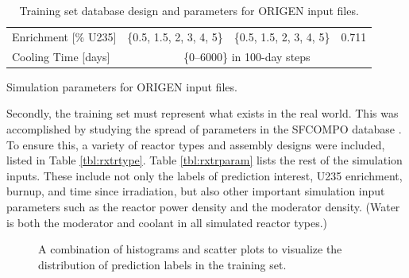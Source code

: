 \begin{table}[!htb]
\begin{subtable}{\linewidth}
\begin{tabular}{@{}llll@{}}
      Enrichment [\% U235]    & \{0.5, 1.5, 2, 3, 4, 5\}         & \{0.5, 1.5, 2, 3, 4, 5\}         & 0.711         \\
      Cooling Time [days]     & \multicolumn{3}{c}{\{0--6000\} in 100-day steps}                                    \\ \bottomrule
    \end{tabular}
    \caption{Simulation parameters for \gls{ORIGEN} input files.}
    \label{tbl:rxtrparam}
  \end{subtable}%
  \caption{Training set database design and parameters for \gls{ORIGEN} input files.}
  \label{tbl:train}
\end{table}

Secondly, the training set must represent what exists in the real world. This
was accomplished by studying the spread of parameters in the \gls{SFCOMPO}
database \cite{sfcompo, valid_sfco}.  To ensure this, a variety of reactor
types and assembly designs were included, listed in Table \ref{tbl:rxtrtype}.
Table \ref{tbl:rxtrparam} lists the rest of the simulation inputs. These
include not only the labels of prediction interest, \gls{U235} enrichment,
burnup, and time since irradiation, but also other important simulation input
parameters such as the reactor power density and the moderator density.  (Water
is both the moderator and coolant in all simulated reactor types.)

\begin{figure}[!hbt]
  \caption{A combination of histograms and scatter plots to visualize the 
           distribution of prediction labels in the training set.}
  \label{fig:trainhist}
\end{figure}

